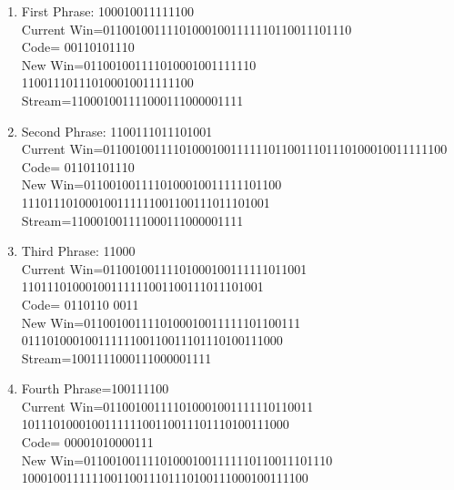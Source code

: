 \begin{solution}
\begin{enumerate}
\item First Phrase: 100010011111100 \\ 
Current Win=011001001111010001001111110110011101110 \\
Code= 00110101110\\
New Win=011001001111010001001111110\\110011101110100010011111100 \\
Stream=110001001111000111000001111

\item Second Phrase: 1100111011101001 \\
Current Win=011001001111010001001111110110011101110100010011111100 \\
Code= 01101101110\\
New Win=0110010011110100010011111101100\\111011101000100111111001100111011101001 \\
Stream=110001001111000111000001111

\item Third Phrase: 11000 \\
Current Win=01100100111101000100111111011001\\11011101000100111111001100111011101001 \\
Code= 0110110 0011\\
New Win=0110010011110100010011111101100111\\01110100010011111100110011101110100111000 \\
Stream=1001111000111000001111

\item Fourth Phrase=100111100 \\
Current Win=011001001111010001001111110110011\\101110100010011111100110011101110100111000 \\
Code= 00001010000111\\
New Win=011001001111010001001111110110011101110\\100010011111100110011101110100111000100111100 
 
\end{enumerate}
\end{solution}

